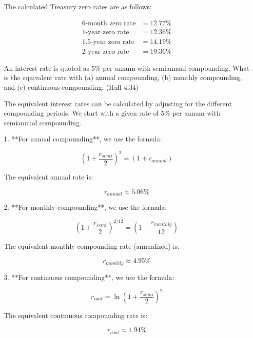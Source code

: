 \documentclass[12pt,letterpaper, onecolumn]{exam}
\begin{document}
\begin{questions}
    \begin{solution}
            The calculated Treasury zero rates are as follows:

\[
\begin{aligned}
\text{6-month zero rate} &= 12.77\% \\
\text{1-year zero rate} &= 12.36\% \\
\text{1.5-year zero rate} &= 14.19\% \\
\text{2-year zero rate} &= 19.36\%
\end{aligned}
\]

    \end{solution}

\newpage
    \question An interest rate is quoted as 5\% per annum with semiannual compounding. What is the equivalent rate with (a) annual compounding, (b) monthly compounding, and (c) continuous compounding. (Hull 4.34)

    \begin{solution}
     The equivalent interest rates can be calculated by adjusting for the different compounding periods. 
We start with a given rate of 5\% per annum with semiannual compounding.

1. **For annual compounding**, we use the formula:

\[
(1 + \frac{r_{semi}}{2})^2 = (1 + r_{annual})
\]

The equivalent annual rate is:

\[
r_{annual} \approx 5.06\%
\]

2. **For monthly compounding**, we use the formula:

\[
(1 + \frac{r_{semi}}{2})^{2/12} = (1 + \frac{r_{monthly}}{12})
\]

The equivalent monthly compounding rate (annualized) is:

\[
r_{monthly} \approx 4.95\%
\]

3. **For continuous compounding**, we use the formula:

\[
r_{cont} = \ln(1 + \frac{r_{semi}}{2})^2
\]

The equivalent continuous compounding rate is:

\[
r_{cont} \approx 4.94\%
\]
       
    \end{solution}

    
\end{questions}
\end{document}
